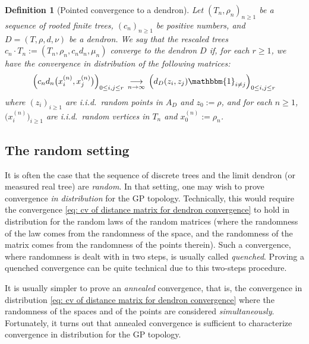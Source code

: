\documentclass{article}
\newtheorem{definition}[theorem]{Definition}
\theoremstyle{remark}
\newcommand{\cv}[1]{\,\underset{#1}{\longrightarrow}\,}
\newcommand{\One}[1]{\mathbbm{1}_{#1}}
\begin{document}
\begin{definition}[Pointed convergence to a dendron]
\label{def: convergence to a fixed dendron}
    Let $(T_n,\rho_n)_{n\ge1}$ be a sequence of rooted finite trees, $(c_n)_{n\ge1}$ be positive numbers, and $D=(T,\rho,d,\nu)$ be a dendron.
    We say that the rescaled trees $c_n \cdot T_n := (T_n, \rho_n, c_n d_n, \mu_n)$ converge to the dendron $D$ if, for each $r\ge1$, we have the convergence in distribution of the following matrices:
    \begin{equation}\label{eq: cv of distance matrix for dendron convergence}
        \left( c_n d_n{\big( x_i^{(n)}, x_j^{(n)} \big)} \right)_{0\le i,j\le r}
        \cv{n\to\infty}
        \left( d_D{\left(z_i, z_j\right)} \One{i\ne j} \right)_{0\le i,j\le r}
    \end{equation}
    where $(z_i)_{i\ge1}$ are i.i.d.~random points in $A_D$ and $z_0 := \rho$, and for each $n\ge1$, $\big(x_i^{(n)}\big)_{i\ge1}$ are i.i.d.~random vertices in $T_n$ and $x_0^{(n)} := \rho_n$.
\end{definition}



\subsection{The random setting}

It is often the case that the sequence of discrete trees and the limit dendron (or measured real tree) are \emph{random}.
In that setting, one may wish to prove convergence \emph{in distribution} for the GP topology.
Technically, this would require the convergence \eqref{eq: cv of distance matrix for dendron convergence} to hold in distribution for the random laws of the random matrices (where the randomness of the law comes from the randomness of the space, and the randomness of the matrix comes from the randomness of the points therein).
Such a convergence, where randomness is dealt with in two steps, is usually called \emph{quenched}.
Proving a quenched convergence can be quite technical due to this two-steps procedure.

It is usually simpler to prove an \emph{annealed} convergence, that is, the convergence in distribution \eqref{eq: cv of distance matrix for dendron convergence} where the randomness of the spaces and of the points are considered \emph{simultaneously}.
Fortunately, it turns out that annealed convergence is sufficient to characterize convergence in distribution for the GP topology.
\end{document}
